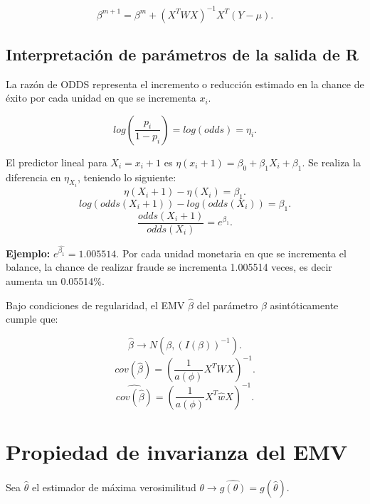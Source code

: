 \documentclass{article}
\begin{document}
\[ \beta^{m+1}=\beta^{m}+{(X^{T}WX)}^{-1}X^{T}{(Y-\mu)}.\]

\subsection{Interpretación de parámetros de la salida de R}
La razón de ODDS representa el incremento o reducción estimado en la chance de éxito por cada unidad en que se incrementa $x_{i}$. 

\[ log{(\frac{p_{i}}{1-p_{i}})}=log(odds)=\eta_{i}.\]

El predictor lineal para $X_{i}=x_{i}+1$ es $\eta{(x_{i}+1)}=\beta_{0}+\beta_{1}X_{i}+\beta_{1}$. Se realiza la diferencia en $\eta_{X_{i}}$, teniendo lo siguiente:
\[ \eta{(X_{i}+1)}-\eta{(X_{i})}=\beta_{1}.\]
\[ log{(odds{(X_{i}+1)})}-log{(odds{(X_{i})})}=\beta_{1}.\]
\[ \frac{odds{(X_{i}+1)}}{odds{(X_{i})}}=e^{\beta_{1}}.\]

\textbf{Ejemplo:} $e^{\hat{\beta_{1}}}=1.005514$. Por cada unidad monetaria en que se incrementa el balance, la chance de realizar fraude se incrementa 1.005514 veces, es decir aumenta un 0.05514\%.

Bajo condiciones de regularidad, el EMV $\hat{\beta}$ del parámetro $\beta$ asintóticamente cumple que:

\[ \hat{\beta} \rightarrow N{(\beta,{(I{(\beta)})}^{-1})}.\]
\[ cov{(\hat{\beta})}={(\frac{1}{a{(\phi)}}X^{T}WX)}^{-1}.\]
\[ \hat{cov{(\hat{\beta})}}={(\frac{1}{a{(\phi)}}X^{T}\hat{w}X)}^{-1}.\]
\section{Propiedad de invarianza del EMV}

Sea $\hat{\theta}$ el estimador de máxima verosimilitud $\theta \rightarrow \hat{g{(\theta)}} = g{(\hat{\theta})}$.
\end{document}
